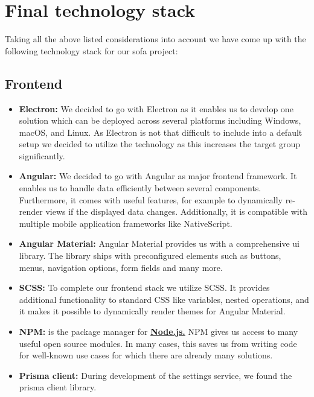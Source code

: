 \section{Final technology stack}\label{sec:final-technology-stack}

Taking all the above listed considerations into account we have come up with the following technology stack for our
\ac{sofa} project:

\subsection{Frontend}\label{subsec:frontend}

\begin{itemize}
    \item \textbf{Electron:} We decided to go with Electron as it enables us to develop one solution which can be
        deployed across several platforms including Windows, macOS, and Linux.
        As Electron is not that difficult to include into a default setup we decided to utilize the technology as this
        increases the target group significantly.
    \item \textbf{Angular:} We decided to go with Angular as major frontend framework.
        It enables us to handle data efficiently between several components.
        Furthermore, it comes with useful features, for example to dynamically re-render views if the displayed data
        changes.
        Additionally, it is compatible with multiple mobile application frameworks like NativeScript.
    \item \textbf{Angular Material:} Angular Material provides us with a comprehensive \ac{ui} library.
        The library ships with preconfigured elements such as buttons, menus, navigation options, form fields and many
        more.
    \item \textbf{SCSS:} To complete our frontend stack we utilize SCSS. It provides additional functionality to
        standard CSS like variables, nested operations, and it makes it possible to dynamically render themes for
        Angular Material.
    \item \textbf{NPM:} is the package manager for \hyperref[subsec:backend]{\textbf{Node.js.}} NPM gives us access to many useful open source modules. In many cases, this saves us from writing code for well-known use cases for which there are already many solutions.
    \item \textbf{Prisma client:} During development of the settings service, we found the prisma client library.

\end{itemize}
